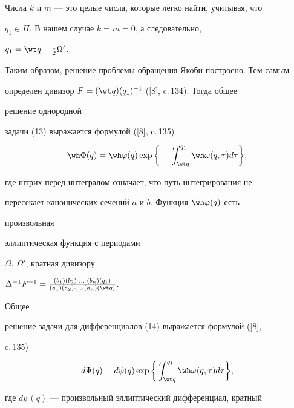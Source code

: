 Числа $k$ и $m$ --- это целые числа, которые легко найти, учитывая, что 


$q_1\in\Pi$. В нашем случае $k=m=0$, а следовательно, 


$q_1=\wt q-\frac{1}{2}\Omega'$. 


 


Таким образом, решение проблемы обращения Якоби построено. Тем самым 


определен дивизор $F=(\wt q)(q_1)^{-1}$ ([8], c.\,134). Тогда общее 


решение однородной 


задачи (13) выражается формулой ([8], c.\,135) 


\begin{equation} 


\wh\Phi(q)=\wh\varphi(q)\exp\bigg\{- 


\overset{\;\scriptsize\prime}{\phantom{I}}\!\!\!


\int^{q_1}_{\wt q}\wh\omega(q,\tau)d\tau\bigg\}, 


\end{equation} 


где штрих перед интегралом означает, что путь интегрирования не 


пересекает канонических сечений $a$ и $b$. Функция $\wh\varphi(q)$ есть 


произвольная 


эллиптическая функция с периодами 


$\Omega$, $\Omega'$, кратная дивизору 


$\Delta^{-1}F^{-1}= 


\frac{(b_1)(b_2)\cdot\dotsc\cdot(b_n)(q_1)} 


{(a_1)(a_2)\cdot\dotsc\cdot(a_n)(\wt q)}$. 


Общее 


решение задачи для дифференциалов (14) выражается формулой ([8], 


c.\,135) 


\begin{equation} 


d\Psi(q)=d\psi(q)\exp\bigg\{ 


\overset{\;\scriptsize\prime}{\phantom{I}}\!\!\!


\int^{q_1}_{\wt q}\wh\omega(q,\tau)d\tau\bigg\}, 


\end{equation} 


где $d\psi(q)$ --- произвольный эллиптический дифференциал, кратный 


